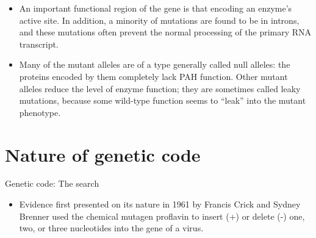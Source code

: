 \documentclass[11pt,dvipsnames,ignorenonframetext,aspectratio=169]{beamer}
\providecommand{\tightlist}{%
  \setlength{\itemsep}{0pt}\setlength{\parskip}{0pt}}
\begin{document}
\begin{frame}{}
\protect\hypertarget{section-3}{}

\begin{itemize}
\tightlist
\item
  An important functional region of the gene is that encoding an
  enzyme's active site. In addition, a minority of mutations are found
  to be in introns, and these mutations often prevent the normal
  processing of the primary RNA transcript.
\item
  Many of the mutant alleles are of a type generally called null
  alleles: the proteins encoded by them completely lack PAH function.
  Other mutant alleles reduce the level of enzyme function; they are
  sometimes called leaky mutations, because some wild-type function
  seems to ``leak'' into the mutant phenotype.
\end{itemize}

\end{frame}

\hypertarget{nature-of-genetic-code}{%
\section{Nature of genetic code}\label{nature-of-genetic-code}}

\begin{frame}{Genetic code: The search}
\protect\hypertarget{genetic-code-the-search}{}

\begin{itemize}
\tightlist
\item
  Evidence first presented on its nature in 1961 by Francis Crick and
  Sydney Brenner used the chemical mutagen proflavin to insert (+) or
  delete (-) one, two, or three nucleotides into the gene of a virus.

\end{itemize}

\end{frame}
\end{document}
